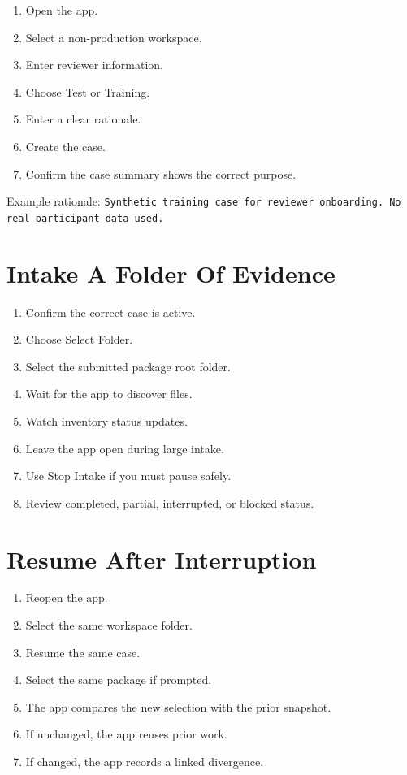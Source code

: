\begin{enumerate}
  \item Open the app.
  \item Select a non-production workspace.
  \item Enter reviewer information.
  \item Choose Test or Training.
  \item Enter a clear rationale.
  \item Create the case.
  \item Confirm the case summary shows the correct purpose.
\end{enumerate}

Example rationale: \texttt{Synthetic training case for reviewer onboarding. No real participant data used.}

\section{Intake A Folder Of Evidence}

\begin{enumerate}
  \item Confirm the correct case is active.
  \item Choose Select Folder.
  \item Select the submitted package root folder.
  \item Wait for the app to discover files.
  \item Watch inventory status updates.
  \item Leave the app open during large intake.
  \item Use Stop Intake if you must pause safely.
  \item Review completed, partial, interrupted, or blocked status.
\end{enumerate}

\section{Resume After Interruption}

\begin{enumerate}
  \item Reopen the app.
  \item Select the same workspace folder.
  \item Resume the same case.
  \item Select the same package if prompted.
  \item The app compares the new selection with the prior snapshot.
  \item If unchanged, the app reuses prior work.
  \item If changed, the app records a linked divergence.
\end{enumerate}

